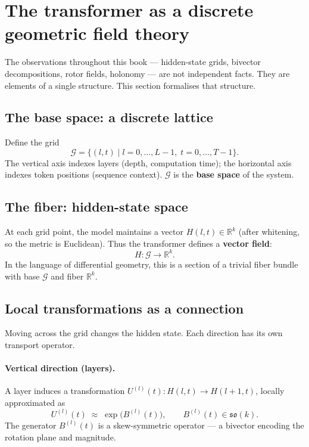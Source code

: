 \documentclass[11pt, twoside, openright]{memoir}
\numberwithin{equation}{chapter}
\begin{document}
\section{The transformer as a discrete geometric field theory}
\label{sec:field-theory}

The observations throughout this book --- hidden-state grids, bivector
decompositions, rotor fields, holonomy --- are not independent facts.
They are elements of a single structure.  This section formalises
that structure.

\subsection{The base space: a discrete lattice}

Define the grid
\begin{equation}
  \mathcal{G} = \{(l,t) \mid l = 0,\dots,L-1,\; t = 0,\dots,T-1\}.
\end{equation}
The vertical axis indexes layers (depth, computation time); the
horizontal axis indexes token positions (sequence context).
$\mathcal{G}$ is the \textbf{base space} of the system.

\subsection{The fiber: hidden-state space}

At each grid point, the model maintains a vector
$H(l,t) \in \mathbb{R}^k$ (after whitening, so the metric is
Euclidean).  Thus the transformer defines a \textbf{vector field}:
\begin{equation}
  H : \mathcal{G} \longrightarrow \mathbb{R}^k.
\end{equation}
In the language of differential geometry, this is a section of a
trivial fiber bundle with base $\mathcal{G}$ and fiber
$\mathbb{R}^k$.

\subsection{Local transformations as a connection}

Moving across the grid changes the hidden state.  Each direction
has its own transport operator.

\paragraph{Vertical direction (layers).}
A layer induces a transformation
$U^{(l)}(t) : H(l,t) \to H(l+1,t)$,
locally approximated as
\begin{equation}
  U^{(l)}(t) \;\approx\; \exp\!\big(B^{(l)}(t)\big),
  \qquad B^{(l)}(t) \in \mathfrak{so}(k).
\end{equation}
The generator $B^{(l)}(t)$ is a skew-symmetric operator --- a
bivector encoding the rotation plane and magnitude.
\end{document}
